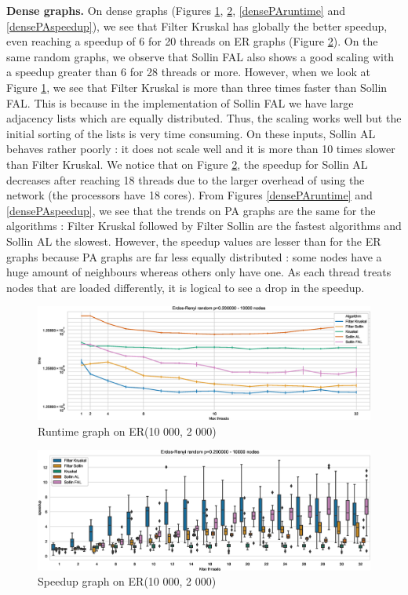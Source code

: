 \documentclass[letterpaper]{article}
\newcommand{\mypar}[1]{{\bf #1.}}
\begin{document}
\mypar{Dense graphs} On dense graphs (Figures \ref{denseERruntime}, \ref{denseERspeedup}, \ref{densePAruntime} and \ref{densePAspeedup}), we see that Filter Kruskal has globally the better speedup, even reaching a speedup of 6 for 20 threads on ER graphs (Figure \ref{denseERspeedup}). On the same random graphs, we observe that Sollin FAL also shows a good scaling with a speedup greater than 6 for 28 threads or more. However, when we look at Figure \ref{denseERruntime}, we see that Filter Kruskal is more than three times faster than Sollin FAL. This is because in the implementation of Sollin FAL we have large adjacency lists which are equally distributed. Thus, the scaling works well but the initial sorting of the lists is very time consuming. On these inputs, Sollin AL behaves rather poorly : it does not scale well and it is more than 10 times slower than Filter Kruskal. We notice that on Figure \ref{denseERspeedup}, the speedup for Sollin AL decreases after reaching 18 threads due to the larger overhead of using the network (the processors have 18 cores). From Figures \ref{densePAruntime} and \ref{densePAspeedup}, we see that the trends on PA graphs are the same for the algorithms : Filter Kruskal followed by Filter Sollin are the fastest algorithms and Sollin AL the slowest. However, the speedup values are lesser than for the ER graphs because PA graphs are far less equally distributed : some nodes have a huge amount of neighbours whereas others only have one. As each thread treats nodes that are loaded differently, it is logical to see a drop in the speedup.

\begin{figure}\centering
  \includegraphics[width=\linewidth]{graphics/Graph_runtime_Erdos-Renyi_random_p=0.200000_10000.eps}
  \caption{Runtime graph on ER(10 000, 2 000)\label{denseERruntime}}
\end{figure}

\begin{figure}\centering
  \includegraphics[width=\linewidth]{graphics/Box_Speedup_Erdos-Renyi_random_p=0.200000_10000.eps}
  \caption{Speedup graph on ER(10 000, 2 000)\label{denseERspeedup}}
\end{figure}
\end{document}
